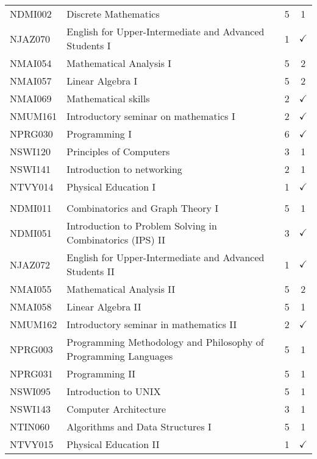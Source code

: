 \documentclass[a4paper,10pt]{article}
\begin{document}
\begin{center}

\tabletail{%
}
\tablelasttail{}	

\begin{supertabular}{l l c c}
\\
 
 
NDMI002 & Discrete Mathematics & 5 & 1\\
NJAZ070 & English for Upper-Intermediate and Advanced Students I & 1 & $\checkmark$\\
NMAI054 & Mathematical Analysis I & 5 & 2\\
NMAI057 & Linear Algebra I & 5 & 2\\
NMAI069 & Mathematical skills & 2 & $\checkmark$\\
NMUM161 & Introductory seminar on mathematics I & 2 & $\checkmark$\\
NPRG030 & Programming I & 6 & $\checkmark$\\
NSWI120 & Principles of Computers & 3 & 1\\
NSWI141 & Introduction to networking & 2 & 1\\
NTVY014 & Physical Education I & 1 & $\checkmark$\\

\hline\\

NDMI011 & Combinatorics and Graph Theory I & 5 & 1\\

NDMI051 & Introduction to Problem Solving in Combinatorics (IPS) II & 3 & $\checkmark$\\

NJAZ072 & English for Upper-Intermediate and Advanced Students II & 1 & $\checkmark$\\
NMAI055 & Mathematical Analysis II & 5 & 2\\
NMAI058 & Linear Algebra II & 5 & 1\\
NMUM162 & Introductory seminar in mathematics II & 2 & $\checkmark$\\
NPRG003 & Programming Methodology and Philosophy of Programming Languages & 5 & 1\\
NPRG031 & Programming II & 5 & 1\\
NSWI095 & Introduction to UNIX & 5 & 1\\
NSWI143 & Computer Architecture & 3 & 1\\
NTIN060 & Algorithms and Data Structures I & 5 & 1\\
NTVY015 & Physical Education II & 1 & $\checkmark$\\
 


\end{supertabular}
\end{center}
\end{document}

